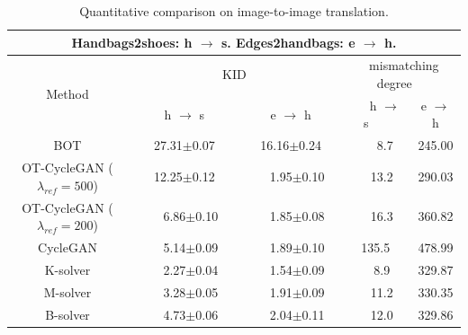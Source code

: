 \documentclass[runningheads]{llncs}
\begin{document}
\begin{table}[!t]
	\centering
	\vspace{-10pt}
	\caption{Quantitative comparison on image-to-image translation.}
	\vspace{3pt}
	\begin{tabular}{c|c|c|c|c}
	    \multicolumn{5}{c}{Handbags2shoes: h $\rightarrow$ s.  Edges2handbags: e $\rightarrow$ h.} \\
		\hline
		\multirow{2}{*}{Method} & \multicolumn{2}{c|}{~~~~~~~~~~~~~~KID~~~~~~~~~~~~~~} & \multicolumn{2}{c}{~mismatching degree~~} \\ \cline{2-5} 
		& ~~~h $\rightarrow$ s~~~ & e $\rightarrow$ h & ~~~h $\rightarrow$ s~~~    & e $\rightarrow$ h                 \\ \hline %
		BOT \cite{large-scale}                    & 27.31$\pm$0.07  & 16.16$\pm$0.24 & ~~~8.7                & 245.00             \\ \hline
		OT-CycleGAN \cite{ot-cyclegan} ($\lambda_{ref}=500$)            & 12.25$\pm$0.12  & ~~1.95$\pm$0.10  & ~~13.2               & 290.03             \\ \hline
		OT-CycleGAN \cite{ot-cyclegan} ($\lambda_{ref}=200$)            & ~~6.86$\pm$0.10   & ~~1.85$\pm$0.08  & ~~16.3               & 360.82             \\ \hline
		CycleGAN \cite{cyclegan}               & ~~5.14$\pm$0.09   & ~~1.89$\pm$0.10  & 135.5              & 478.99             \\ \hline
		K-solver               & ~~2.27$\pm$0.04   & ~~1.54$\pm$0.09  & ~~8.9               & 329.87             \\ \hline
		M-solver               & ~~3.28$\pm$0.05   & ~~1.91$\pm$0.09  & ~~11.2                & 330.35             \\ \hline
		B-solver               & ~~4.73$\pm$0.06   & ~~2.04$\pm$0.11  & ~~12.0                & 329.86             \\ \hline		
	\end{tabular}
	\label{image_translation_table}
	\vspace{-15pt}
\end{table}
\end{document}
